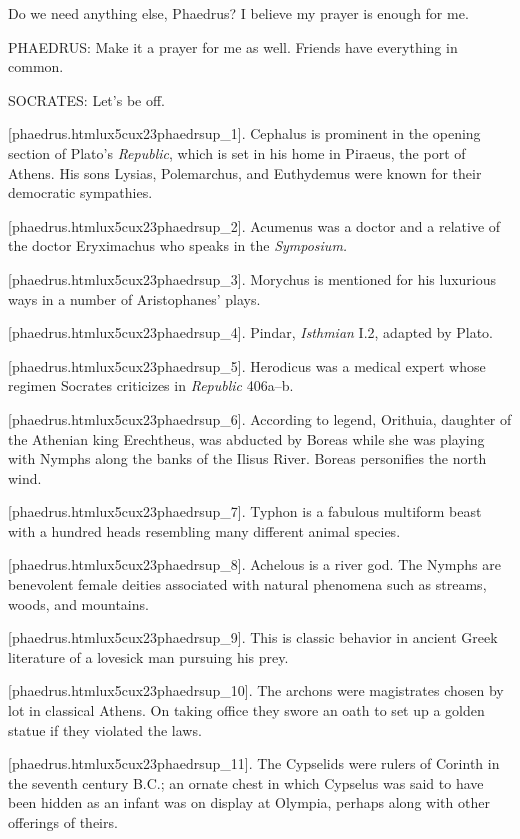 Do we need anything else, Phaedrus? I believe my prayer is enough for
me.

PHAEDRUS: Make it a prayer for me as well. Friends have everything in
common.

SOCRATES: Let's be off.\crlf
\crlf

[phaedrus.htmlux5cux23phaedrsup_1]. Cephalus is prominent in the
opening section of Plato's {\em Republic}, which is set in his home in
Piraeus, the port of Athens. His sons Lysias, Polemarchus, and
Euthydemus were known for their democratic sympathies.

[phaedrus.htmlux5cux23phaedrsup_2]. Acumenus was a doctor and a
relative of the doctor Eryximachus who speaks in the {\em Symposium.}

[phaedrus.htmlux5cux23phaedrsup_3]. Morychus is mentioned for
his luxurious ways in a number of Aristophanes' plays.

[phaedrus.htmlux5cux23phaedrsup_4]. Pindar, {\em Isthmian} I.2,
adapted by Plato.

[phaedrus.htmlux5cux23phaedrsup_5]. Herodicus was a medical
expert whose regimen Socrates criticizes in {\em Republic} 406a--b.

[phaedrus.htmlux5cux23phaedrsup_6]. According to legend,
Orithuia, daughter of the Athenian king Erechtheus, was abducted by
Boreas while she was playing with Nymphs along the banks of the Ilisus
River. Boreas personifies the north wind.

[phaedrus.htmlux5cux23phaedrsup_7]. Typhon is a fabulous
multiform beast with a hundred heads resembling many different animal
species.

[phaedrus.htmlux5cux23phaedrsup_8]. Achelous is a river god. The
Nymphs are benevolent female deities associated with natural phenomena
such as streams, woods, and mountains.

[phaedrus.htmlux5cux23phaedrsup_9]. This is classic behavior in
ancient Greek literature of a lovesick man pursuing his prey.

[phaedrus.htmlux5cux23phaedrsup_10]. The archons were
magistrates chosen by lot in classical Athens. On taking office they
swore an oath to set up a golden statue if they violated the laws.

[phaedrus.htmlux5cux23phaedrsup_11]. The Cypselids were rulers
of Corinth in the seventh century B.C.; an ornate chest in which
Cypselus was said to have been hidden as an infant was on display at
Olympia, perhaps along with other offerings of theirs.

